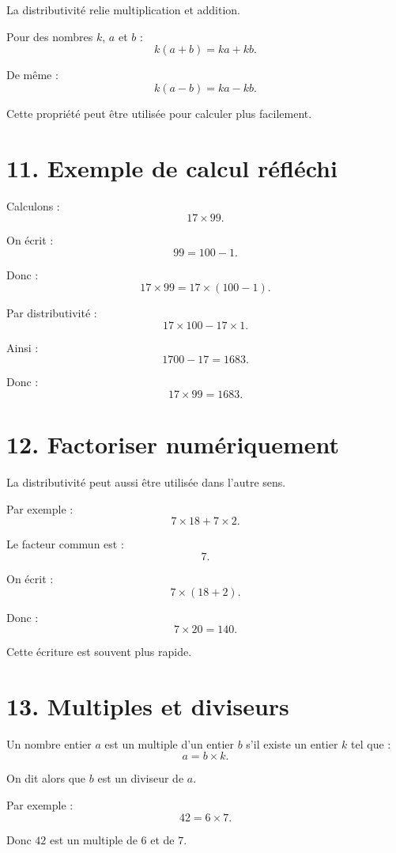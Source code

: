 La distributivité relie multiplication et addition.

\begin{propriete}
Pour des nombres $k$, $a$ et $b$ :
\[
k(a+b)=ka+kb.
\]

De même :
\[
k(a-b)=ka-kb.
\]
\end{propriete}

Cette propriété peut être utilisée pour calculer plus facilement.

\section{11. Exemple de calcul réfléchi}

Calculons :
\[
17\times99.
\]

On écrit :
\[
99=100-1.
\]

Donc :
\[
17\times99
=
17\times(100-1).
\]

Par distributivité :
\[
17\times100-17\times1.
\]

Ainsi :
\[
1700-17=1683.
\]

Donc :
\[
\boxed{17\times99=1683}.
\]

\section{12. Factoriser numériquement}

La distributivité peut aussi être utilisée dans l'autre sens.

Par exemple :
\[
7\times18+7\times2.
\]

Le facteur commun est :
\[
7.
\]

On écrit :
\[
7\times(18+2).
\]

Donc :
\[
7\times20=140.
\]

Cette écriture est souvent plus rapide.

\section{13. Multiples et diviseurs}

\begin{definition}
Un nombre entier $a$ est un multiple d'un entier $b$ s'il existe un entier $k$ tel que :
\[
a=b\times k.
\]

On dit alors que $b$ est un diviseur de $a$.
\end{definition}

Par exemple :
\[
42=6\times7.
\]

Donc $42$ est un multiple de $6$ et de $7$.

